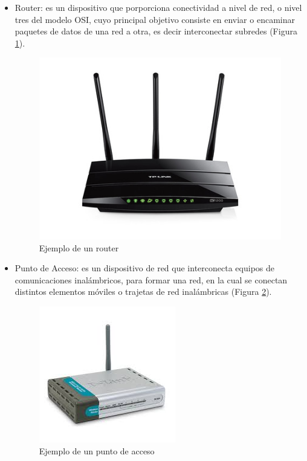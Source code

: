  \begin{itemize}
	\item Router: es un dispositivo que porporciona conectividad a nivel de red, o nivel tres del modelo OSI, cuyo principal objetivo consiste en enviar o encaminar paquetes de datos de una red a otra, es decir interconectar subredes (Figura \ref{fig:router}).

\begin{figure}[!h]
	\centering
		\includegraphics[scale=0.5]{Imagenes/router}
		\caption{Ejemplo de un router}
		\label{fig:router}
	\end{figure}	

	\item Punto de Acceso: es un dispositivo de red que interconecta equipos de comunicaciones inalámbricos, para formar una red, en la cual se conectan distintos elementos móviles o trajetas de red inalámbricas (Figura \ref{fig:pa}).

\begin{figure}[!h]
	\centering
		\includegraphics[scale=0.5]{Imagenes/pa}
		\caption{Ejemplo de un punto de acceso}
		\label{fig:pa}
	\end{figure}	
\end{itemize}   

